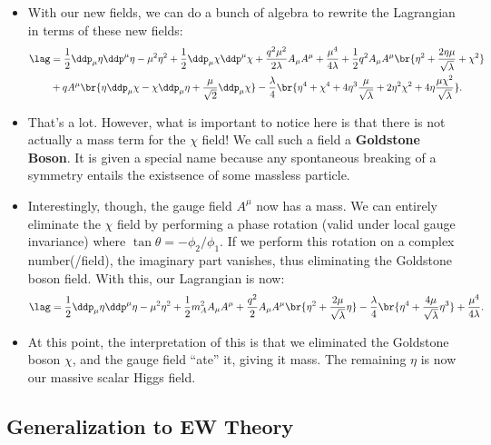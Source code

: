 \begin{itemize}
\item With our new fields, we can do a bunch of algebra to rewrite the Lagrangian in terms of these new fields:
  \begin{align}
    \lag &= \frac{1}{2}\ddp_\mu\eta \ddp^\mu\eta - \mu^2\eta^2 + \frac{1}{2}\ddp_\mu\chi \ddp^\mu\chi + \frac{q^2\mu^2}{2\lambda}A_\mu A^\mu + \frac{\mu^4}{4\lambda} + \frac{1}{2}q^2A_\mu A^\mu \br{\eta^2 + \frac{2\eta\mu}{\sqrt{\lambda}} + \chi^2} \\
    &+ qA^\mu\br{\eta\ddp_\mu\chi - \chi\ddp_\mu\eta + \frac{\mu}{\sqrt{2}}\ddp_\mu\chi} - \frac{\lambda}{4}\br{\eta^4 + \chi^4 + 4\eta^3 \frac{\mu}{\sqrt{\lambda}} + 2\eta^2\chi^2 + 4\eta \frac{\mu\chi^2}{\sqrt{\lambda}}}.
  \end{align}
\item That's a lot. However, what is important to notice here is that there is not actually a mass term for the $\chi$ field! We call such a field a \textbf{Goldstone Boson}. It is given a special name because any spontaneous breaking of a symmetry entails the existsence of some massless particle.
\item Interestingly, though, the gauge field $A^\mu$ now has a mass. We can entirely eliminate the $\chi$ field by performing a phase rotation (valid under local gauge invariance) where $\tan\theta = -\phi_2/\phi_1$. If we perform this rotation on a complex number(/field), the imaginary part vanishes, thus eliminating the Goldstone boson field. With this, our Lagrangian is now:
  \begin{equation}
    \lag = \frac{1}{2}\ddp_\mu\eta\ddp^\mu\eta - \mu^2\eta^2 + \frac{1}{2}m_A^2A_\mu A^\mu + \frac{q^2}{2}A_\mu A^\mu \br{\eta^2 + \frac{2\mu}{\sqrt{\lambda}}\eta} - \frac{\lambda}{4}\br{\eta^4 + \frac{4\mu}{\sqrt{\lambda}}\eta^3} + \frac{\mu^4}{4\lambda}.
  \end{equation}
\item At this point, the interpretation of this is that we eliminated the Goldstone boson $\chi$, and the gauge field ``ate'' it, giving it mass. The remaining $\eta$ is now our massive scalar Higgs field.
  
\end{itemize}




\subsection{Generalization to EW Theory}

